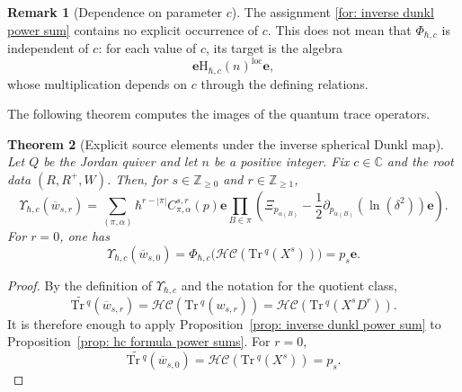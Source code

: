 \documentclass[11pt,reqno]{amsart}
\newtheorem{theorem}{Theorem}[section]
\theoremstyle{definition}
\newtheorem{remark}[theorem]{Remark}
\newcommand{\bbC}{\mathbb{C}}
\newcommand{\bbZ}{\mathbb{Z}}
\newcommand{\be}{\mathbf{e}}
\newcommand{\Tr}{\mathrm{Tr} \,}
\newcommand{\rmH}{\mathrm{H}}
\newcommand{\hc}{\mathcal{HC}}
\newcommand{\loc}{{\mathrm{loc}}}
\begin{document}
\begin{remark}[Dependence on parameter \(c\)]
	\label{rem:inverse-spherical-dunkl-c-dependence}
	The assignment \eqref{for: inverse dunkl power sum}
	contains no explicit occurrence of \(c\). This does not mean that
	\(\Phi_{\hbar,c}\) is independent of \(c\): for each value of \(c\), its target is the algebra
	\[
	\be\rmH_{\hbar,c}(n)^\loc\be,
	\]
	whose multiplication depends on \(c\) through the defining relations.
\end{remark}

The following theorem computes the images of the quantum trace operators.



\begin{theorem}[Explicit source elements under the inverse spherical Dunkl map]
\label{thm: Upsilon in power-sum}
Let \(Q\) be the Jordan quiver and let \(n\) be a positive integer.
Fix \(c\in\bbC\) and the root data \((R,R^+,W)\). Then, for
\(s\in\bbZ_{\geq0}\) and \(r\in\bbZ_{\geq1}\),
\begin{equation}\label{eq:image-quantum-trace-inverse-dunkl-power-sum}
	\Upsilon_{\hbar,c}(\overline w_{s,r})
	=
				\sum_{(\pi,\alpha)}\hbar^{r - |\pi|}
				C_{\pi,\alpha}^{s,r}(p)\be
				\prod_{B\in\pi}
				\left(
				\Xi_{p_{\alpha(B)}}
				-
				\frac{1}{2}
				\partial_{p_{\alpha(B)}}(\ln (\delta^2))\be
				\right).
		\end{equation}
For \(r=0\), one has
\[
	\Upsilon_{\hbar,c}(\overline w_{s,0})
	=\Phi_{\hbar,c}\bigl(\hc(\Tr^q(X^s))\bigr)=p_s\be.
\]
\end{theorem}


\begin{proof}
By the definition of \(\Upsilon_{\hbar,c}\) and the notation for the
quotient class,
\[
\widetilde{\Tr^q}(\overline w_{s,r})
=
\hc\!\left(\Tr^q(w_{s,r})\right)
=
\hc\!\left(\Tr^q(X^sD^r)\right).
\]
It is therefore enough to apply
Proposition~\ref{prop: inverse dunkl power sum} to
Proposition~\ref{prop: hc formula power sums}.  For \(r=0\),
\[
\widetilde{\Tr^q}(\overline w_{s,0})
=
\hc\!\left(\Tr^q(X^s)\right)
=p_s.
\]
\end{proof}


















\end{document}
